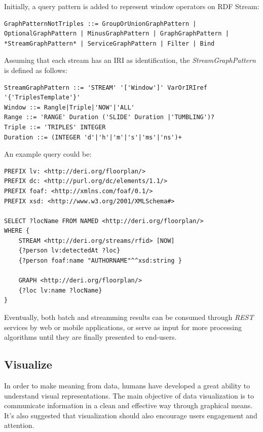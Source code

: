 Initially, a query pattern is added to represent window operators on RDF Stream:

\begin{lstlisting}
GraphPatternNotTriples ::= GroupOrUnionGraphPattern |
OptionalGraphPattern | MinusGraphPattern | GraphGraphPattern |
*StreamGraphPattern* | ServiceGraphPattern | Filter | Bind
\end{lstlisting}

Assuming that each stream has an IRI as identification, the \textit{StreamGraphPattern} is defined as follows:

\begin{lstlisting}
StreamGraphPattern ::= 'STREAM' '['Window']' VarOrIRIref 
'{'TriplesTemplate'}'
Window ::= Rangle|Triple|'NOW'|'ALL'
Range ::= 'RANGE' Duration ('SLIDE' Duration |'TUMBLING')?
Triple ::= 'TRIPLES' INTEGER
Duration ::= (INTEGER 'd'|'h'|'m'|'s'|'ms'|'ns')+
\end{lstlisting}

An example query could be:

\begin{lstlisting}
PREFIX lv: <http://deri.org/floorplan/>
PREFIX dc: <http://purl.org/dc/elements/1.1/>
PREFIX foaf: <http://xmlns.com/foaf/0.1/>
PREFIX xsd: <http://www.w3.org/2001/XMLSchema#>

SELECT ?locName FROM NAMED <http://deri.org/floorplan/> 
WHERE {
	STREAM <http://deri.org/streams/rfid> [NOW]
	{?person lv:detectedAt ?loc}
	{?person foaf:name "AUTHORNAME"^^xsd:string }

	GRAPH <http://deri.org/floorplan/>
	{?loc lv:name ?locName}
}
\end{lstlisting}

Eventually, both batch and streamming results can be consumed through \textit{REST} services by web or mobile applications, or serve as input for more processing algorithms until they are finally presented to end-users.

\subsection{Visualize}

In order to make meaning from data, humans have developed a great ability to understand visual representations. The main objective of data visualization is to communicate information in a clean and effective way through graphical means. It's also suggested that visualization should also encourage users engagement and attention.

